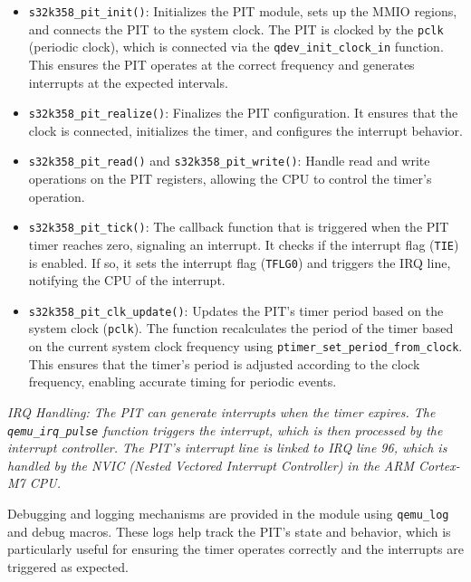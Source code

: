 \begin{itemize}
    \item \texttt{s32k358\_pit\_init()}: Initializes the PIT module, sets up the MMIO regions, and connects the PIT to the system clock. The PIT is clocked by the \texttt{pclk} (periodic clock), which is connected via the \texttt{qdev\_init\_clock\_in} function. This ensures the PIT operates at the correct frequency and generates interrupts at the expected intervals.
    \item \texttt{s32k358\_pit\_realize()}: Finalizes the PIT configuration. It ensures that the clock is connected, initializes the timer, and configures the interrupt behavior.
    \item \texttt{s32k358\_pit\_read()} and \texttt{s32k358\_pit\_write()}: Handle read and write operations on the PIT registers, allowing the CPU to control the timer’s operation.
    \item \texttt{s32k358\_pit\_tick()}: The callback function that is triggered when the PIT timer reaches zero, signaling an interrupt. It checks if the interrupt flag (\texttt{TIE}) is enabled. If so, it sets the interrupt flag (\texttt{TFLG0}) and triggers the IRQ line, notifying the CPU of the interrupt.
    \item \texttt{s32k358\_pit\_clk\_update()}: Updates the PIT's timer period based on the system clock (\texttt{pclk}). The function recalculates the period of the timer based on the current system clock frequency using \texttt{ptimer\_set\_period\_from\_clock}. This ensures that the timer’s period is adjusted according to the clock frequency, enabling accurate timing for periodic events.
\end{itemize}

\begin{center}
    \textit{IRQ Handling: The PIT can generate interrupts when the timer expires. The \texttt{qemu\_irq\_pulse} function triggers the interrupt, which is then processed by the interrupt controller. The PIT’s interrupt line is linked to IRQ line 96, which is handled by the NVIC (Nested Vectored Interrupt Controller) in the ARM Cortex-M7 CPU.}
\end{center}

\noindent Debugging and logging mechanisms are provided in the module using \texttt{qemu\_log} and debug macros. These logs help track the PIT’s state and behavior, which is particularly useful for ensuring the timer operates correctly and the interrupts are triggered as expected.
    
